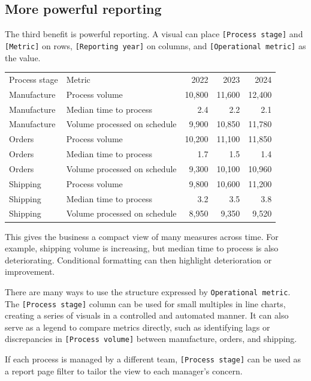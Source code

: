 \documentclass[10pt,openany,10pt]{book}
\newcounter{none}
\let\podeToprule\toprule
\let\podeMidrule\midrule
\let\podeBottomrule\bottomrule
\renewcommand{\toprule}{\arrayrulecolor{pbiGrid}\podeToprule}
\renewcommand{\midrule}{\arrayrulecolor{pbiGrid}\podeMidrule}
\renewcommand{\bottomrule}{\arrayrulecolor{pbiGrid}\podeBottomrule}
\begin{document}
\subsection{More powerful reporting}\label{more-powerful-reporting}

The third benefit is powerful reporting. A visual can place
\texttt{{[}Process\ stage{]}} and \texttt{{[}Metric{]}} on rows,
\texttt{{[}Reporting\ year{]}} on columns, and
\texttt{{[}Operational\ metric{]}} as the value.

{\def\LTcaptype{none} %
\begin{longtable}[]{@{}llrrr@{}}
\toprule\noalign{}
Process stage & Metric & 2022 & 2023 & 2024 \\
\midrule\noalign{}
\endhead
\bottomrule\noalign{}
\endlastfoot
Manufacture & Process volume & 10,800 & 11,600 & 12,400 \\
Manufacture & Median time to process & 2.4 & 2.2 & 2.1 \\
Manufacture & Volume processed on schedule & 9,900 & 10,850 & 11,780 \\
Orders & Process volume & 10,200 & 11,100 & 11,850 \\
Orders & Median time to process & 1.7 & 1.5 & 1.4 \\
Orders & Volume processed on schedule & 9,300 & 10,100 & 10,960 \\
Shipping & Process volume & 9,800 & 10,600 & 11,200 \\
Shipping & Median time to process & 3.2 & 3.5 & 3.8 \\
Shipping & Volume processed on schedule & 8,950 & 9,350 & 9,520 \\
\end{longtable}
}

This gives the business a compact view of many measures across time. For
example, shipping volume is increasing, but median time to process is
also deteriorating. Conditional formatting can then highlight
deterioration or improvement.

There are many ways to use the structure expressed by
\texttt{\textquotesingle{}Operational\ metric\textquotesingle{}}. The
\texttt{{[}Process\ stage{]}} column can be used for small multiples in
line charts, creating a series of visuals in a controlled and automated
manner. It can also serve as a legend to compare metrics directly, such
as identifying lags or discrepancies in \texttt{{[}Process\ volume{]}}
between manufacture, orders, and shipping.

If each process is managed by a different team,
\texttt{{[}Process\ stage{]}} can be used as a report page filter to
tailor the view to each manager's concern.
\end{document}
